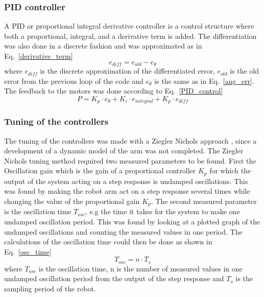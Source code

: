 \subsubsection{PID controller}
A PID or proportional integral derivative controller is a control structure where both a proportional, integral, and a derivative term is added. The differentiation was also done in a discrete fashion and was approximated as in Eq.~\eqref{derivative_term}
\begin{equation}
    e_{diff} = e_{old} - e_{\theta}
    \label{derivative_term}
\end{equation}
where \(e_{diff}\) is the discrete approximation of the differentiated error, \(e_{old}\) is the old error from the previous loop of the code and \(e_{\theta}\) is the same as in Eq.~\eqref{ang_err}. The feedback to the motors was done according to Eq.~\eqref{PID_control}
\begin{equation}
    P = K_p\cdot e_{\theta} + K_i\cdot e_{integral} + K_p\cdot e_{diff}
    \label{PID_control}
\end{equation}
\subsubsection{Tuning of the controllers}
The tuning of the controllers was made with a Ziegler Nichols approach \parencite{FeedbackControl}, since a development of a dynamic model of the arm was not completed. The Ziegler Nichols tuning method required two measured parameters to be found. First the Oscillation gain which is the gain of a proportional controller \(K_p\) for which the output of the system acting on a step response is undamped oscillations. This was found by making the robot arm act on a step response several times while changing the value of the proportional gain \(K_p\). The second measured parameter is the oscillation time \(T_{osc}\), e.g the time it takes for the system to make one undamped oscillation period. This was found by looking at a plotted graph of the undamped oscillations and counting the measured values in one period. The calculations of the oscillation time could then be done as shown in Eq.~\eqref{osc_time}
\begin{equation}
    T_{osc} = n\cdot T_s
    \label{osc_time}
\end{equation}
where \(T_{osc}\) is the oscillation time, n is the number of measured values in one undamped oscillation period from the output of the step response and \(T_s\) is the sampling period of the robot.

